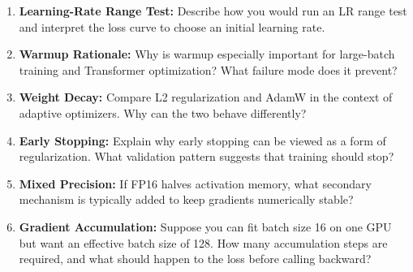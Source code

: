 \begin{enumerate}
    \item \textbf{Learning-Rate Range Test:} Describe how you would run an LR range test and interpret the loss curve to choose an initial learning rate.

    \item \textbf{Warmup Rationale:} Why is warmup especially important for large-batch training and Transformer optimization? What failure mode does it prevent?

    \item \textbf{Weight Decay:} Compare L2 regularization and AdamW in the context of adaptive optimizers. Why can the two behave differently?

    \item \textbf{Early Stopping:} Explain why early stopping can be viewed as a form of regularization. What validation pattern suggests that training should stop?

    \item \textbf{Mixed Precision:} If FP16 halves activation memory, what secondary mechanism is typically added to keep gradients numerically stable?

    \item \textbf{Gradient Accumulation:} Suppose you can fit batch size 16 on one GPU but want an effective batch size of 128. How many accumulation steps are required, and what should happen to the loss before calling backward?
\end{enumerate}

